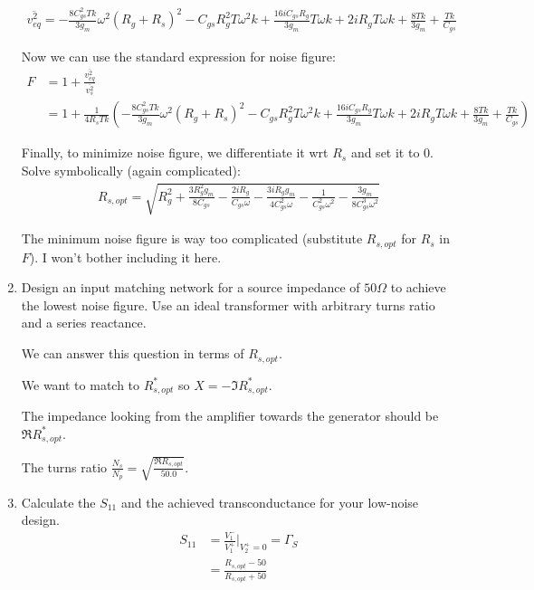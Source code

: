 \begin{enumerate}[label=(\alph*)]
    \begin{align*}
        \overline{v_{eq}^2} = - \frac{8 C_{gs}^{2} T k}{3 g_{m}} \omega^{2} \left(R_{g} + R_{s}\right)^{2} - C_{gs} R_{g}^{2} T \omega^{2} k + \frac{16 i C_{gs} R_{g}}{3 g_{m}} T \omega k + 2 i R_{g} T \omega k + \frac{8 T k}{3 g_{m}} + \frac{T k}{C_{gs}}
    \end{align*}

    Now we can use the standard expression for noise figure:
    \begin{align*}
        F &= 1 + \frac{\overline{v_{eq}^2}}{\overline{v_s^2}} \\
        &= 1 + \frac{1}{4 R_{s} T k} \left(- \frac{8 C_{gs}^{2} T k}{3 g_{m}} \omega^{2} \left(R_{g} + R_{s}\right)^{2} - C_{gs} R_{g}^{2} T \omega^{2} k + \frac{16 i C_{gs} R_{g}}{3 g_{m}} T \omega k + 2 i R_{g} T \omega k + \frac{8 T k}{3 g_{m}} + \frac{T k}{C_{gs}}\right)
    \end{align*}

    Finally, to minimize noise figure, we differentiate it wrt $R_s$ and set it to 0. Solve symbolically (again complicated):
    \begin{align*}
        R_{s,opt} = \sqrt{R_{g}^{2} + \frac{3 R_{g}^{2} g_{m}}{8 C_{gs}} - \frac{2 i R_{g}}{C_{gs} \omega} - \frac{3 i R_{g} g_{m}}{4 C_{gs}^{2} \omega} - \frac{1}{C_{gs}^{2} \omega^{2}} - \frac{3 g_{m}}{8 C_{gs}^{3} \omega^{2}}}
    \end{align*}

    The minimum noise figure is way too complicated (substitute $R_{s,opt}$ for $R_s$ in $F$). I won't bother including it here.

    \item {\color{blue} Design an input matching network for a source impedance of $50\Omega$ to achieve the lowest noise figure. Use an ideal transformer with arbitrary turns ratio and a series reactance.}

    We can answer this question in terms of $R_{s,opt}$.

    We want to match to $R_{s,opt}^*$ so $X = -\Im{R_{s,opt}^*}$.

    The impedance looking from the amplifier towards the generator should be $\Re{R_{s,opt}^*}$.

    The turns ratio $\frac{N_s}{N_p} = \sqrt{\frac{\Re{R_{s,opt}}}{50.0}}$.

    \item {\color{blue} Calculate the $S_{11}$ and the achieved transconductance for your low-noise design.}
    \begin{align*}
        S_{11} &= \frac{V_1^-}{V_1^+} \rvert_{V_2^+ = 0} = \Gamma_S \\
        &= \frac{R_{s,opt} - 50}{R_{s,opt} + 50}
    \end{align*}


\end{enumerate}
